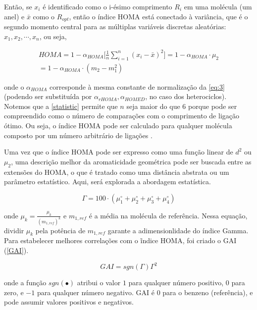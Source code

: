 Então, se $x_i$ é identificado como o i-ésimo comprimento $R_i$ em uma molécula (um anel) e $\bar{x}$ como o $R_{opt}$, então o índice \gls{HOMA} está conectado à variância, que é o segundo momento central para as múltiplas variáveis discretas aleatórias: $x_1, x_2, \cdots, x_n$, ou seja, 

\begin{equation}
\label{statistic}
\begin{split}
    HOMA = 1 - \alpha_{HOMA} \bigg[\frac{1}{n} \sum_{i=1}^n (x_i - \bar{x})^2 \bigg] = 1 - \alpha_{HOMA} \cdot \mu_2 \\ = 1 - \alpha_{HOMA} \cdot (m_2 - m_1^2 )
\end{split}
\end{equation}

\noindent onde o $\alpha_{HOMA}$ corresponde à mesma constante de normalização da \autoref{eq:3} (podendo ser substituída por $\alpha_{rHOMA}, \alpha_{HOMED}$, no caso dos heterociclos). Notemos que a \autoref{statistic} permite que $n$ seja maior do que 6 porque pode ser compreendido como o número de comparações com o comprimento de ligação ótimo. Ou seja, o índice \gls{HOMA} pode ser calculado para qualquer molécula composto por um número arbitrário de ligações .

Uma vez que o índice \gls{HOMA} pode ser expresso como uma função linear de $d^2$ ou $\mu_2$, uma descrição melhor da aromaticidade geométrica pode ser buscada entre as extensões do \gls{HOMA}, o que é tratado como uma distância abstrata ou um parâmetro estatístico. Aqui, será explorada a abordagem estatística.

\begin{equation}
    \Gamma = 100 \cdot (\mu_1^\circ + \mu_2^\circ + \mu_3^\circ + \mu_4^\circ)
\end{equation}

\noindent onde $\mu_k = \displaystyle \frac{\mu_k}{(m_{1, ref})^k}$ e $m_{1, ref}$ é a média na molécula de referência. Nessa equação, dividir $\mu_k$ pela potência de $m_{1, ref}$ garante a adimensionlidade do índice \gls{Gamma}. Para estabelecer melhores correlações com o ĩndice \gls{HOMA}, foi criado o \gls{GAI} (\autoref{GAI}).

\begin{equation}
\label{GAI}
GAI = sgn(\Gamma) \Gamma^2
\end{equation}

\noindent onde a função $sgn (\bullet)$ atribui o valor $1$ para qualquer número positivo, $0$ para zero, e $-1$ para qualquer número negativo. \gls{GAI} é $0$ para o benzeno (referência), e pode assumir valores positivos e negativos.

